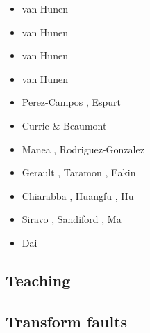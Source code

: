 \begin{scriptsize}
\begin{itemize}
\item[\twothousand] van Hunen \etal \cite{vavv00}
\item[\twothousandone] van Hunen \etal \cite{vavv01}
\item[\twothousandtwo] van Hunen \etal \cite{vavv02,vavv02b}
\item[\twothousandfour] van Hunen \etal \cite{vavv04d}
\item[\twothousandeight] Perez-Campos \etal \cite{pekh08}, Espurt \etal \cite{esfm08}
\item[\twothousandeleven] Currie \& Beaumont \cite{cube11}
\item[\twothousandtwelve] Manea \etal \cite{mapm12}, Rodriguez-Gonzalez \etal \cite{ronb12}
\item[\twothousandfifteen] Gerault \etal \cite{gehm15}, Taramon \etal \cite{tarn15},
                           Eakin \etal \cite{ealw15}
\item[\twothousandsixteen] Chiarabba \etal \cite{chdf16}, Huangfu \etal \cite{huwc16}, Hu \etal \cite{hulh16}
\item[\twothousandnineteen] Siravo \etal \cite{sifg19}, Sandiford \etal \cite{sams19b},
                            Ma \etal \cite{malg19}
\item[\twothousandtwenty] Dai \etal \cite{dawl20}
\end{itemize}
\end{scriptsize}

\subsection{Teaching} 

\begin{scriptsize}
\cite{grap11}
\cite{kerh14}
\cite{bemg19}
\end{scriptsize}


\subsection{Transform faults} 

